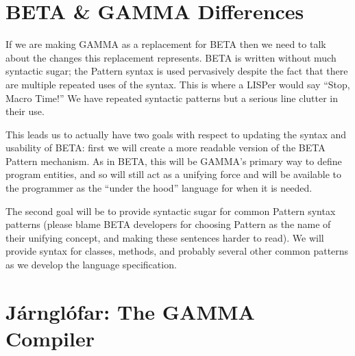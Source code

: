 \documentclass[10pt]{article}
\newcommand{\Lang}{GAMMA}
\newcommand{\Compiler}{J\'arngl\'ofar}
\newcommand{\OLang}{BETA}
\begin{document}
\section*{\OLang{} \& \Lang{} Differences}
If we are making \Lang{} as a replacement for \OLang{} then we need to talk
about the changes this replacement represents. \OLang{} is written without
much syntactic sugar; the Pattern syntax is used pervasively despite the
fact that there are multiple repeated uses of the syntax. This is where a
LISPer would say ``Stop, Macro Time!'' We have repeated syntactic patterns
but a serious line clutter in their use.

This leads us to actually have two goals with respect to updating the syntax
and usability of \OLang{}: first we will create a more readable version of
the \OLang{} Pattern mechanism. As in \OLang, this will be \Lang{}'s primary
way to define program entities, and so will still act as a unifying force
and will be available to the programmer as the ``under the hood'' language
for when it is needed.

The second goal will be to provide syntactic sugar for common Pattern syntax
patterns (please blame \OLang{} developers for choosing Pattern as the name
of their unifying concept, and making these sentences harder to read). We will
provide syntax for classes, methods, and probably several other common patterns
as we develop the language specification.


\section*{\Compiler{}: The \Lang{} Compiler}
\end{document}
